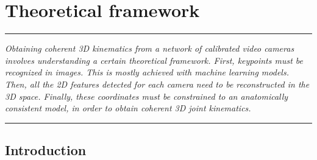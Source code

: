 
\lhead[\fancyplain{}{\leftmark}]%
      {\fancyplain{}{}} %
\chead[\fancyplain{}{}]%
      {\fancyplain{}{}}
\rhead[\fancyplain{}{}]%
      {\fancyplain{}{\rightmark}}%
\lfoot[\fancyplain{}{}]%
      {\fancyplain{}{}}
\cfoot[\fancyplain{}{\thepage}]%
      {\fancyplain{}{\thepage}} %
\rfoot[\fancyplain{}{}]%
     {\fancyplain{}{\scriptsize}}



\chapter{Theoretical framework}
\label{ch:2}


\begin{center}
\rule{0.7\linewidth}{.5pt}
\begin{minipage}{0.7\linewidth}
\smallskip

\textit{Obtaining coherent 3D kinematics from a network of calibrated video cameras involves understanding a certain theoretical framework. First, keypoints must be recognized in images. This is mostly achieved with machine learning models. Then, all the 2D features detected for each camera need to be reconstructed in the 3D space. Finally, these coordinates must be constrained to an anatomically consistent model, in order to obtain coherent 3D joint kinematics.}

\end{minipage}
\smallskip
\rule{0.7\linewidth}{.5pt}
\end{center}

\minitoc
\newpage

\section{Introduction}

